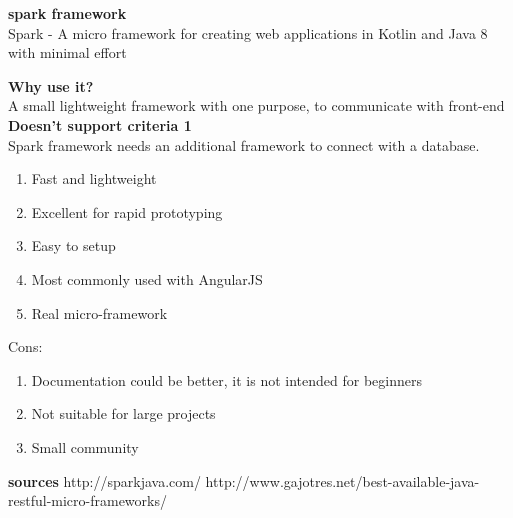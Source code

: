\textbf{spark framework}\\
Spark - A micro framework for creating web applications in Kotlin and Java 8 with minimal effort

\textbf{Why use it?} \\
A small lightweight framework with one purpose, to communicate with front-end \\

\textbf{Doesn't support criteria 1}\\
Spark framework needs an additional framework  to connect with a database.

\begin{enumerate}
	\item Fast and lightweight
	\item Excellent for rapid prototyping
	\item Easy to setup
	\item Most commonly used with AngularJS
	\item Real micro-framework
\end{enumerate}
Cons:
\begin{enumerate}
	\item Documentation could be better, it is not intended for beginners
	\item Not suitable for large projects
	\item Small community
\end{enumerate}

\textbf{sources}
http://sparkjava.com/
http://www.gajotres.net/best-available-java-restful-micro-frameworks/